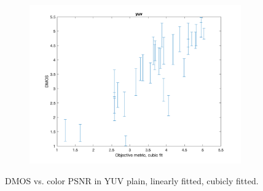 \documentclass{article}
\begin{document}
\begin{figure}
\begin{subfigure}[b]{0.65\textwidth}
   \includegraphics[width=\textwidth]{Figures/task3/yuv_cubic.png}
   \end{subfigure}%
    \caption{DMOS vs. color PSNR in YUV plain, linearly fitted, cubicly fitted.}
    \label{fig:yuv_fitted}
\end{figure}
\end{document}
